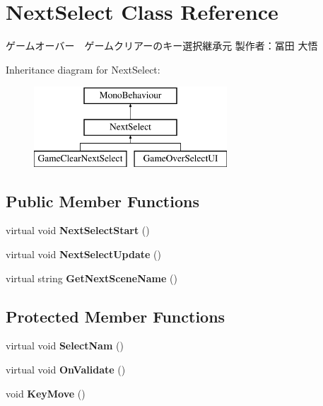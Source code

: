 \hypertarget{class_next_select}{}\section{Next\+Select Class Reference}
\label{class_next_select}


ゲームオーバー　ゲームクリアーのキー選択継承元 製作者：冨田 大悟  


Inheritance diagram for Next\+Select\+:\begin{figure}[H]
\begin{center}
\leavevmode
\includegraphics[height=3.000000cm]{class_next_select}
\end{center}
\end{figure}
\subsection*{Public Member Functions}
\begin{DoxyCompactItemize}
\item 
\mbox{\label{class_next_select_a649f7b4a3295f845c3466921c480be61}} 
virtual void {\bfseries Next\+Select\+Start} ()
\item 
\mbox{\label{class_next_select_af3959d0f1a6e7d815245a4509854ca59}} 
virtual void {\bfseries Next\+Select\+Update} ()
\item 
\mbox{\label{class_next_select_a07da0afe3e7d172dff6308b282af7f3b}} 
virtual string {\bfseries Get\+Next\+Scene\+Name} ()
\end{DoxyCompactItemize}
\subsection*{Protected Member Functions}
\begin{DoxyCompactItemize}
\item 
\mbox{\label{class_next_select_a965077294f754d53d63fa4b6d790e43d}} 
virtual void {\bfseries Select\+Nam} ()
\item 
\mbox{\label{class_next_select_af53e48fd6b6f547ddec9b8c0a505546b}} 
virtual void {\bfseries On\+Validate} ()
\item 
\mbox{\label{class_next_select_af2cb526af30d17f11a49fb12434367e0}} 
void {\bfseries Key\+Move} ()
\end{DoxyCompactItemize}
